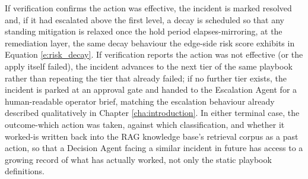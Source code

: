 If verification confirms the action was effective, the incident is marked resolved and, if it had escalated above the first level, a decay is scheduled so that any standing mitigation is relaxed once the hold period elapses-mirroring, at the remediation layer, the same decay behaviour the edge-side risk score exhibits in Equation \ref{e:risk_decay}. If verification reports the action was not effective (or the apply itself failed), the incident advances to the next tier of the same playbook rather than repeating the tier that already failed; if no further tier exists, the incident is parked at an approval gate and handed to the Escalation Agent for a human-readable operator brief, matching the escalation behaviour already described qualitatively in Chapter \ref{cha:introduction}. In either terminal case, the outcome-which action was taken, against which classification, and whether it worked-is written back into the RAG knowledge base's retrieval corpus as a past action, so that a Decision Agent facing a similar incident in future has access to a growing record of what has actually worked, not only the static playbook definitions.

